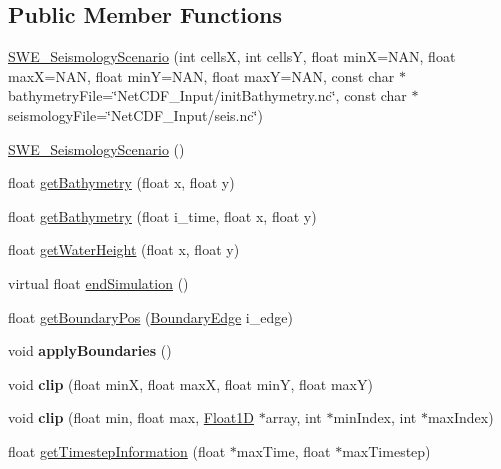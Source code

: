 \subsection*{Public Member Functions}
\begin{DoxyCompactItemize}
\item 
\hyperlink{classSWE__SeismologyScenario_a88e5d040e746317bd39535f437b299b9}{S\-W\-E\-\_\-\-Seismology\-Scenario} (int cells\-X, int cells\-Y, float min\-X=N\-A\-N, float max\-X=N\-A\-N, float min\-Y=N\-A\-N, float max\-Y=N\-A\-N, const char $\ast$bathymetry\-File=\char`\"{}Net\-C\-D\-F\-\_\-\-Input/init\-Bathymetry.\-nc\char`\"{}, const char $\ast$seismology\-File=\char`\"{}Net\-C\-D\-F\-\_\-\-Input/seis.\-nc\char`\"{})
\item 
\hyperlink{classSWE__SeismologyScenario_a2a541317288ae7fe5c9b1b75f8faaec4}{S\-W\-E\-\_\-\-Seismology\-Scenario} ()
\item 
float \hyperlink{classSWE__SeismologyScenario_a2cbfbb644689d1596be3b31b55547f98}{get\-Bathymetry} (float x, float y)
\item 
float \hyperlink{classSWE__SeismologyScenario_a4959bacdb08fcea5d9fde10362984dbb}{get\-Bathymetry} (float i\-\_\-time, float x, float y)
\item 
float \hyperlink{classSWE__SeismologyScenario_ad58eca7e1a6a04b8795e05b9c89791ad}{get\-Water\-Height} (float x, float y)
\item 
virtual float \hyperlink{classSWE__SeismologyScenario_a8dbcae5c46033d9ceb7414ded0af993c}{end\-Simulation} ()
\item 
float \hyperlink{classSWE__SeismologyScenario_a7b72a08127dd7f76a9d9dc9224ea2203}{get\-Boundary\-Pos} (\hyperlink{SWE__Scenario_8hh_aa5e01e3f7df312f7b9b0d02521141fcc}{Boundary\-Edge} i\-\_\-edge)
\item 
\hypertarget{classSWE__SeismologyScenario_a93aa63711af3ee4b7c27c244b881df38}{void {\bfseries apply\-Boundaries} ()}\label{classSWE__SeismologyScenario_a93aa63711af3ee4b7c27c244b881df38}

\item 
\hypertarget{classSWE__SeismologyScenario_a2ae282b3726c0c05ea146d660ae5ef02}{void {\bfseries clip} (float min\-X, float max\-X, float min\-Y, float max\-Y)}\label{classSWE__SeismologyScenario_a2ae282b3726c0c05ea146d660ae5ef02}

\item 
\hypertarget{classSWE__SeismologyScenario_a3fb0f793e915ba77e905f07ca6448d34}{void {\bfseries clip} (float min, float max, \hyperlink{classFloat1D}{Float1\-D} $\ast$array, int $\ast$min\-Index, int $\ast$max\-Index)}\label{classSWE__SeismologyScenario_a3fb0f793e915ba77e905f07ca6448d34}

\item 
float \hyperlink{classSWE__SeismologyScenario_a08c816386b2549031b6d201a03928890}{get\-Timestep\-Information} (float $\ast$max\-Time, float $\ast$max\-Timestep)
\end{DoxyCompactItemize}
